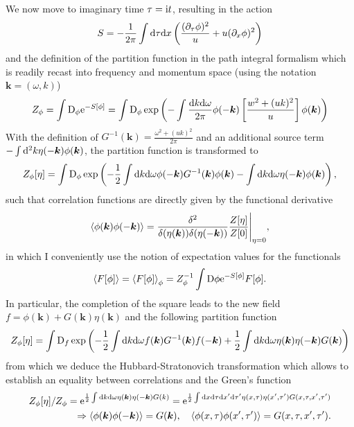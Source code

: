 We now move to imaginary time $\tau=\mathrm i t$, resulting in the action
\begin{align}
    S = -\frac1{2\pi}\int\mathrm d\tau\mathrm d x\left(  \frac{(\partial_\tau\phi)^2}u + u(\partial_x\phi)^2 \right)
\end{align}
and the definition of the partition function in the path integral formalism which is readily recast into frequency and momentum space (using the notation ${\bm k}=(\omega, k)$)
\begin{align}
    Z_\phi = \int\mathrm D_\phi \mathrm e^{-S[\phi]} = \int\mathrm D_\phi \exp\left( -\int\frac{\mathrm d k\mathrm d\omega}{2\pi}\phi(-{\bm k})\left[ \frac{w^2+(uk)^2}{u} \right]\phi({\bm k}) \right)
\end{align}
With the definition of $G^{-1}({\bm k})=\frac{\omega^2+(uk)^2}{2\pi}$ and an additional source term $-\int\mathrm d^2k\eta(-{\bm k})\phi({\bm k})$, the partition function is transformed to
\begin{align}
    Z_\phi[\eta] = \int\mathrm D_\phi \exp\left( -\frac12\int\mathrm d k\mathrm d\omega\phi(-{\bm k})G^{-1}({\bm k})\phi({\bm k}) -\int\mathrm d k\mathrm d\omega\eta(-{\bm k})\phi({\bm k}) \right),
\end{align}
such that correlation functions are directly given by the functional derivative
\begin{align}
    \braket{\phi({\bm k})\phi(-{\bm k})}=\frac{\delta^2}{\delta(\eta({\bm k}))\delta(\eta(-{\bm k}))}\frac{Z[\eta]}{Z[0]}\Bigg|_{\eta=0},
\end{align}
in which I conveniently use the notion of expectation values for the functionals
\begin{align}
    \braket{F[\phi]} = \braket{F[\phi]}_\phi = Z_\phi^{-1}\int\mathrm D\phi\mathrm e^{-S[\phi]}F[\phi].
\end{align}
In particular, the completion of the square leads to the new field $f=\phi({\bm k})+G({\bm k})\eta({\bm k})$ and the following partition function
\begin{align}
    Z_\phi[\eta] = \int\mathrm D_{f}\exp\left( -\frac12\int\mathrm d k\mathrm d\omega f({\bm k})G^{-1}({\bm k})f(-{\bm k}) + \frac12\int\mathrm d k\mathrm d\omega\eta({\bm k})\eta(-{\bm k})G({\bm k}) \right)
\end{align}
from which we deduce the Hubbard-Stratonovich transformation which allows to establish an equality between correlations and the Green's function
\begin{align}
    Z_\phi[\eta]/Z_\phi = \mathrm e^{\frac12\int\mathrm d k\mathrm d\omega \eta({\bm k})\eta(-{\bm k})G(k)}
    = \mathrm e^{\frac12\int\mathrm d x\mathrm d\tau\mathrm d x'\mathrm d\tau' \eta(x,\tau)\eta(x',\tau')G(x,\tau,x',\tau')}
    \label{eq:KG_hubbard_stratonovich_equality}\\
    \Rightarrow \braket{\phi({\bm k})\phi(-{\bm k})} = G({\bm k}),
    \quad
    \braket{\phi(x,\tau)\phi(x',\tau')} = G(x,\tau,x',\tau').
    \label{eq:KG_greens_functions_equality}
\end{align}

